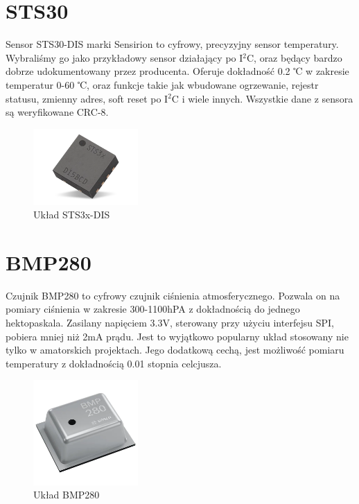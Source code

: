\section{STS30}

Sensor STS30-DIS marki Sensirion to cyfrowy, precyzyjny sensor temperatury. Wybraliśmy go jako przykładowy sensor działający po I$^2$C, oraz będący bardzo dobrze udokumentowany przez producenta. Oferuje dokładność 0.2 ℃ w zakresie temperatur 0-60 ℃, oraz funkcje takie jak wbudowane ogrzewanie, rejestr statusu, zmienny adres, soft reset po I$^2$C i wiele innych\cite{sts_datasheet}. Wszystkie dane z sensora są weryfikowane CRC-8.
\begin{figure}[H]
    \centering
    \includegraphics[width=4cm]{Graphics/sts_img.png}
    \caption{Układ STS3x-DIS\cite{sts_mouser}}
    \label{img:sts_mouser}
\end{figure}

\section{BMP280}

Czujnik BMP280 to cyfrowy czujnik ciśnienia atmosferycznego. Pozwala on na pomiary ciśnienia w zakresie 300-1100hPA z dokładnością do jednego hektopaskala. Zasilany napięciem 3.3V, sterowany przy użyciu interfejsu SPI, pobiera mniej niż 2mA prądu. Jest to wyjątkowo popularny układ stosowany nie tylko w amatorskich projektach. Jego dodatkową cechą, jest możliwość pomiaru temperatury z dokładnością 0.01 stopnia celcjusza\cite{bmp_datasheet}.
\begin{figure}[H]
    \centering
    \includegraphics[width=4cm]{Graphics/bmp_img.png}
    \caption{Układ BMP280\cite{bmp_mouser}}
    \label{img:bmp_mouser}
\end{figure}

